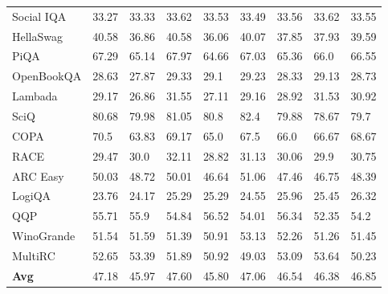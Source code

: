 \documentclass{article}
\theoremstyle{definition}
\theoremstyle{remark}
\begin{document}
\begin{table}[!ht]
\begin{tabular}{lllllllll}
        Social IQA & 33.27 & 33.33 & 33.62 & 33.53 & 33.49 & 33.56 & 33.62 & 33.55 \\ 
        HellaSwag & 40.58 & 36.86 & 40.58 & 36.06 & 40.07 & 37.85 & 37.93 & 39.59 \\ 
        PiQA & 67.29 & 65.14 & 67.97 & 64.66 & 67.03 & 65.36 & 66.0 & 66.55 \\ 
        OpenBookQA & 28.63 & 27.87 & 29.33 & 29.1 & 29.23 & 28.33 & 29.13 & 28.73 \\ 
        Lambada & 29.17 & 26.86 & 31.55 & 27.11 & 29.16 & 28.92 & 31.53 & 30.92 \\ 
        SciQ & 80.68 & 79.98 & 81.05 & 80.8 & 82.4 & 79.88 & 78.67 & 79.7 \\ 
        COPA & 70.5 & 63.83 & 69.17 & 65.0 & 67.5 & 66.0 & 66.67 & 68.67 \\ 
        RACE & 29.47 & 30.0 & 32.11 & 28.82 & 31.13 & 30.06 & 29.9 & 30.75 \\ 
        ARC Easy & 50.03 & 48.72 & 50.01 & 46.64 & 51.06 & 47.46 & 46.75 & 48.39 \\ 
        LogiQA & 23.76 & 24.17 & 25.29 & 25.29 & 24.55 & 25.96 & 25.45 & 26.32 \\ 
        QQP & 55.71 & 55.9 & 54.84 & 56.52 & 54.01 & 56.34 & 52.35 & 54.2 \\ 
        WinoGrande & 51.54 & 51.59 & 51.39 & 50.91 & 53.13 & 52.26 & 51.26 & 51.45 \\ 
        MultiRC & 52.65 & 53.39 & 51.89 & 50.92 & 49.03 & 53.09 & 53.64 & 50.23 \\
        \midrule
        \textbf{Avg} & 47.18 & 45.97 & 47.60 & 45.80 & 47.06 & 46.54 & 46.38 & 46.85 \\ \bottomrule
    \end{tabular}
\end{table}
\end{document}
